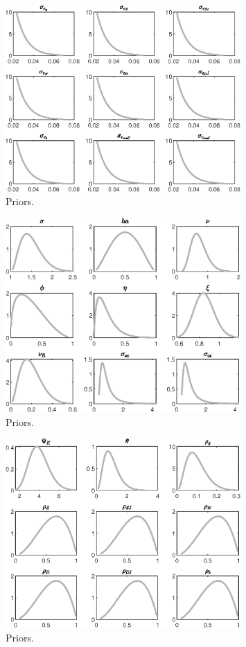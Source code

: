  
\begin{figure}[H]
\centering
\includegraphics[width=0.80\textwidth]{BRS_sectoral_artificial_data/graphs/BRS_sectoral_artificial_data_Priors1}
\caption{Priors.}\label{Fig:Priors:1}
\end{figure}
\begin{figure}[H]
\centering
\includegraphics[width=0.80\textwidth]{BRS_sectoral_artificial_data/graphs/BRS_sectoral_artificial_data_Priors2}
\caption{Priors.}\label{Fig:Priors:2}
\end{figure}
\begin{figure}[H]
\centering
\includegraphics[width=0.80\textwidth]{BRS_sectoral_artificial_data/graphs/BRS_sectoral_artificial_data_Priors3}
\caption{Priors.}\label{Fig:Priors:3}
\end{figure}
